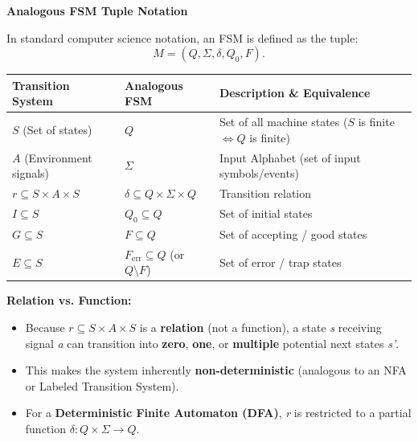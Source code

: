 \documentclass[11pt]{article}
\begin{document}
\textbf{Analogous FSM Tuple Notation}

In standard computer science notation, an FSM is defined as the tuple:
\[
M = (Q, \Sigma, \delta, Q_0, F)
.\] 
\begin{table}[htbp]
\centering
\begin{tabular}{lll}
\toprule
\textbf{Transition System} & \textbf{Analogous FSM} & \textbf{Description \& Equivalence} \\
\midrule
$S$ (Set of states) & $Q$ & Set of all machine states ($S$ is finite $\iff Q$ is finite) \\
$A$ (Environment signals) & $\Sigma$ & Input Alphabet (set of input symbols/events) \\
$r \subseteq S \times A \times S$ & $\delta \subseteq Q \times \Sigma \times Q$ & Transition relation \\
$I \subseteq S$ & $Q_0 \subseteq Q$ & Set of initial states \\
$G \subseteq S$ & $F \subseteq Q$ & Set of accepting / good states \\
$E \subseteq S$ & $F_{\text{err}} \subseteq Q$ (or $Q \setminus F$) & Set of error / trap states \\
\bottomrule
\end{tabular}
\end{table}

\textbf{Relation vs. Function:}
\begin{itemize}
	\item Because $r \subseteq S \times A \times S$ is a \textbf{relation} (not a function), a state \textit{s} receiving signal \textit{a} can transition into \textbf{zero}, \textbf{one}, or \textbf{multiple} potential next states \textit{s'}.
	\item This makes the system inherently \textbf{non-deterministic} (analogous to an NFA or Labeled Transition System).
	\item For a \textbf{Deterministic Finite Automaton (DFA)}, \textit{r} is restricted to a partial function $\delta : Q \times \Sigma \to Q$. 
\end{itemize}
\end{document}
